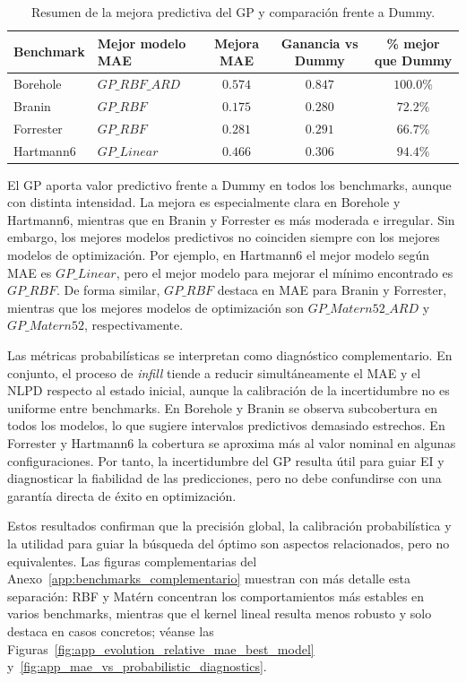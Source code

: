 \begin{table}[h]
\centering
\small
\caption[Mejora predictiva del GP frente a Dummy]{Resumen de la mejora predictiva del GP y comparación frente a Dummy.}
\label{tab:resumen_predictivo_benchmarks}
\begin{tabular}{llccc}
\toprule
Benchmark & Mejor modelo MAE & Mejora MAE & Ganancia vs Dummy & \% mejor que Dummy \\
\midrule
Borehole & \(GP\_RBF\_ARD\) & \(0.574\) & \(0.847\) & \(100.0\%\) \\
Branin & \(GP\_RBF\) & \(0.175\) & \(0.280\) & \(72.2\%\) \\
Forrester & \(GP\_RBF\) & \(0.281\) & \(0.291\) & \(66.7\%\) \\
Hartmann6 & \(GP\_Linear\) & \(0.466\) & \(0.306\) & \(94.4\%\) \\
\bottomrule
\end{tabular}
\end{table}
\FloatBarrier

El GP aporta valor predictivo frente a Dummy en todos los benchmarks, aunque con distinta intensidad. La mejora es especialmente clara en Borehole y Hartmann6, mientras que en Branin y Forrester es más moderada e irregular. Sin embargo, los mejores modelos predictivos no coinciden siempre con los mejores modelos de optimización. Por ejemplo, en Hartmann6 el mejor modelo según MAE es \(GP\_Linear\), pero el mejor modelo para mejorar el mínimo encontrado es \(GP\_RBF\). De forma similar, \(GP\_RBF\) destaca en MAE para Branin y Forrester, mientras que los mejores modelos de optimización son \(GP\_Matern52\_ARD\) y \(GP\_Matern52\), respectivamente.

Las métricas probabilísticas se interpretan como diagnóstico complementario. En conjunto, el proceso de \emph{infill} tiende a reducir simultáneamente el MAE y el NLPD respecto al estado inicial, aunque la calibración de la incertidumbre no es uniforme entre benchmarks. En Borehole y Branin se observa subcobertura en todos los modelos, lo que sugiere intervalos predictivos demasiado estrechos. En Forrester y Hartmann6 la cobertura se aproxima más al valor nominal en algunas configuraciones. Por tanto, la incertidumbre del GP resulta útil para guiar EI y diagnosticar la fiabilidad de las predicciones, pero no debe confundirse con una garantía directa de éxito en optimización.

Estos resultados confirman que la precisión global, la calibración probabilística y la utilidad para guiar la búsqueda del óptimo son aspectos relacionados, pero no equivalentes. Las figuras complementarias del Anexo~\ref{app:benchmarks_complementario} muestran con más detalle esta separación: RBF y Matérn concentran los comportamientos más estables en varios benchmarks, mientras que el kernel lineal resulta menos robusto y solo destaca en casos concretos; véanse las Figuras~\ref{fig:app_evolution_relative_mae_best_model} y~\ref{fig:app_mae_vs_probabilistic_diagnostics}.

